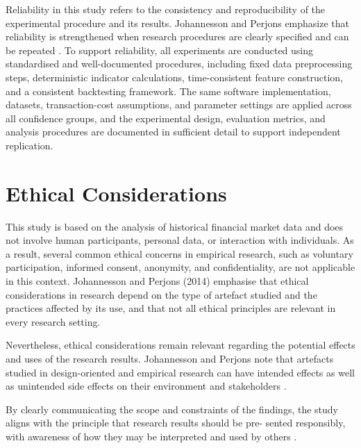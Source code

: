 Reliability in this study refers to the consistency and reproducibility of the
experimental procedure and its results. Johannesson and Perjons emphasize that
reliability is strengthened when research procedures are clearly specified and
can be repeated \citep{johannesson2014design}. To support reliability, all
experiments are conducted using standardised and well-documented procedures,
including fixed data preprocessing steps, deterministic indicator calculations,
time-consistent feature construction, and a consistent backtesting framework.
The same software implementation, datasets, transaction-cost assumptions, and
parameter settings are applied across all confidence groups, and the
experimental design, evaluation metrics, and analysis procedures are documented
in sufficient detail to support independent replication.












\section{Ethical Considerations}

This study is based on the analysis of historical financial market data and does not involve human participants, personal data, or interaction with individuals. As a result, several common ethical concerns in empirical research, such as voluntary participation, informed consent, anonymity, and confidentiality, are not applicable in this context. Johannesson and Perjons (2014) emphasise that ethical considerations in research depend on the type of artefact studied and the practices affected by its use, and that not all ethical principles are relevant in every research setting. 

Nevertheless, ethical considerations remain relevant regarding the potential effects and uses of the research results. Johannesson and Perjons note that artefacts studied in design-oriented and empirical research can have intended effects as well as unintended side effects on their environment and stakeholders \citep{johannesson2014design}. 

By clearly communicating the scope and constraints of the findings, the study aligns with the principle that research results should be pre- sented responsibly, with awareness of how they may be interpreted and used by others \citep{johannesson2014design}.
